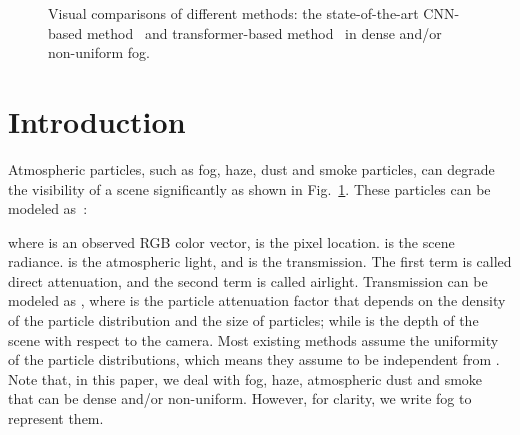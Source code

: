 \documentclass[runningheads]{llncs}
\begin{document}
\begin{figure}[t]
	\centering
		\captionsetup[subfloat]{labelformat=empty}
		\captionsetup[subfloat]{farskip=2pt}
		\setcounter{subfigure}{0}
		\hfill
		\hfill
		\hfill
		\hfill
	\caption{Visual comparisons of different methods: the state-of-the-art CNN-based method~\cite{yang2022self} and transformer-based method~\cite{guo2022image} in dense and/or non-uniform fog.}
	\label{fig:intro}
\end{figure}

\section{Introduction}
\label{sec:intro}
Atmospheric particles, such as fog, haze, dust and smoke particles, can degrade the visibility of a scene significantly as shown in Fig.~\ref{fig:intro}.
These particles can be modeled as~\cite{koschmieder1924theorie}:

where  is an observed RGB color vector,  is the pixel location.  is the scene radiance.  is the atmospheric light, and  is the transmission. 
The first term is called direct attenuation, and the second term is called airlight. 
Transmission  can be modeled as , 
where  is the particle attenuation factor that depends on the density of the particle distribution and the size of particles;
while  is the depth of the scene with respect to the camera. 
Most existing methods assume the uniformity of the particle distributions, which means they assume  to be independent from .
Note that, in this paper, we deal with fog, haze, atmospheric dust and smoke that can be dense and/or non-uniform. However, for clarity, we write fog to represent them.
\end{document}
